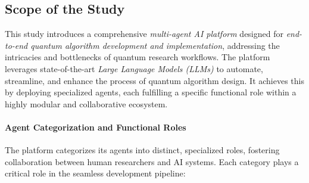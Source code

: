 \documentclass[12pt]{article}
\begin{document}
\subsection{Scope of the Study}
This study introduces a comprehensive \textit{multi-agent AI platform} designed for \textit{end-to-end quantum algorithm development and implementation}, addressing the intricacies and bottlenecks of quantum research workflows. The platform leverages state-of-the-art \textit{Large Language Models (LLMs)} to automate, streamline, and enhance the process of quantum algorithm design. It achieves this by deploying specialized agents, each fulfilling a specific functional role within a highly modular and collaborative ecosystem. 

\paragraph{Agent Categorization and Functional Roles}
The platform categorizes its agents into distinct, specialized roles, fostering collaboration between human researchers and AI systems. Each category plays a critical role in the seamless development pipeline:
\end{document}
